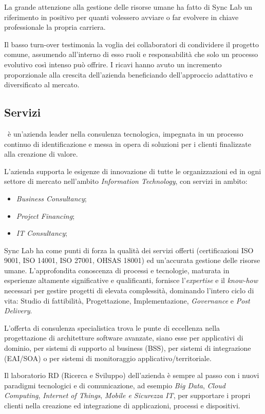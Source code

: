 La grande attenzione alla gestione delle risorse umane ha fatto di Sync Lab un
riferimento in positivo per quanti volessero avviare o far evolvere in chiave professionale la propria carriera.

Il basso turn-over testimonia la voglia dei collaboratori di condividere il progetto comune, assumendo all'interno di esso ruoli e responsabilità che solo un processo
evolutivo così intenso può offrire.
I ricavi hanno avuto un incremento proporzionale alla crescita dell'azienda beneficiando dell'approccio adattativo e diversificato al mercato.

\subsection{Servizi}

\myCompany\ è un'azienda leader nella consulenza tecnologica, impegnata in un
processo continuo di identificazione e messa in opera di soluzioni per i clienti finalizzate
alla creazione di valore.

L'azienda supporta le esigenze di innovazione di tutte le
organizzazioni ed in ogni settore di mercato nell'ambito \textit{Information Technology}, con
servizi in ambito:
\begin{itemize}
	\item \textit{Business Consultancy};
	\item \textit{Project Financing};
	\item \textit{IT Consultancy};
\end{itemize}

Sync Lab ha come punti di forza la qualità dei servizi offerti (certificazioni ISO 9001,
ISO 14001, ISO 27001, OHSAS 18001) ed un'accurata gestione delle risorse umane.
L'approfondita conoscenza di processi e tecnologie, maturata in esperienze altamente
significative e qualificanti, fornisce l'\textit{expertise} e il \textit{know-how} necessari per gestire
progetti di elevata complessità, dominando l'intero ciclo di vita: Studio di fattibilità,
Progettazione, Implementazione, \textit{Governance} e \textit{Post Delivery}.

L'offerta di consulenza specialistica trova le punte di eccellenza nella progettazione di
architetture software avanzate, siano esse per applicativi di dominio, per sistemi di
supporto al business (BSS), per sistemi di integrazione (EAI/SOA) o per sistemi di
monitoraggio applicativo/territoriale.

Il laboratorio RD (Ricerca e Sviluppo) dell'azienda è sempre al passo con i nuovi
paradigmi tecnologici e di comunicazione, ad esempio \textit{Big Data}, \textit{Cloud Computing},
\textit{Internet of Things}, \textit{Mobile e Sicurezza IT}, per supportare i propri clienti nella creazione
ed integrazione di applicazioni, processi e dispositivi.

